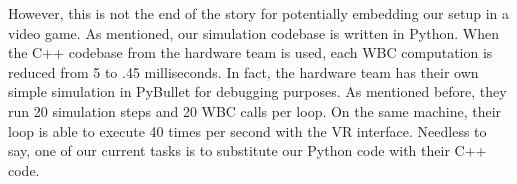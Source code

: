 However, this is not the end of the story for potentially embedding our setup in a video game. As mentioned, our simulation codebase is written in Python. When the C++ codebase from the hardware team is used, each WBC computation is reduced from 5 to .45 milliseconds. In fact, the hardware team has their own simple simulation in PyBullet for debugging purposes. As mentioned before, they run 20 simulation steps and 20 WBC calls per loop. On the same machine, their loop is able to execute 40 times per second with the VR interface. Needless to say, one of our current tasks is to substitute our Python code with their C++ code.
